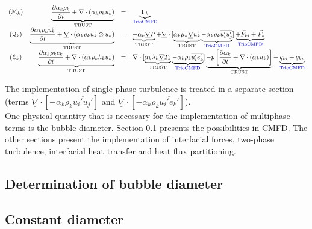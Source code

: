 \begin{equation} \label{eq_6}
	\begin{array}{c r c l}
		(\mathcal{M}_k) 
		& \underbrace{\frac{\partial  \alpha_k \rho_k}{\partial t} + \nabla \cdot ({\alpha_k \rho_k} \vec{u_k})}_\text{TRUST}
		& =
		& \underbrace{\Gamma_k}_\text{\blue TrioCMFD}
		\\
		(\mathcal{Q}_k) 
		& \underbrace{\frac{\partial \alpha_k \rho_k \vec{u_k}}{\partial t} + \underline{\nabla} \cdot ({\alpha_k \rho_k \vec{u_k}} \otimes \vec{u_k})}_\text{TRUST}
		& =
		& \underbrace{-\alpha_k \underline{\nabla} P}_\text{TRUST} +
		\underline{\nabla} \cdot [ \underbrace{\alpha_k \mu_k \underline{\underline{\nabla}} \vec{u_k}}_\text{TRUST} \underbrace{- \alpha_k\rho_k \overline{u_i'u_j'}}_\text{\blue TrioCMFD}]
		\underbrace{+ \vec{F}_{ki}
		+ \vec{F}_k}_\text{\blue TrioCMFD}
		\\
		(\mathcal{E}_k) 
		& \underbrace{\frac{\partial \alpha_k \rho_k e_k}{\partial t} + \nabla \cdot ({\alpha_k \rho_k h_k} \vec{u_k})}_\text{TRUST}
		& =
		& \nabla \cdot [ \underbrace{\alpha_k\lambda_k \underline{\nabla} T_k}_\text{TRUST}  \underbrace{- \alpha_k\rho_k \overline{u_i'e_k'}}_\text{\blue TrioCMFD} ] 
		\underbrace{-p \left[\frac{\partial \alpha_k}{\partial t} + \nabla \cdot (\alpha_k u_k)\right]}_\text{TRUST} +
		\underbrace{q_{ki} +
		q_{kp}}_\text{\blue TrioCMFD}
		
	\end{array}
\end{equation}

The implementation of single-phase turbulence is treated in a separate section (terms $\underline{\nabla} \cdot [ - \alpha_k\rho_k \overline{u_i'u_j'}]$ and  $\underline{\nabla} \cdot [ - \alpha_k\rho_k \overline{u_i'e_k'}]$). \\

One physical quantity that is necessary for the implementation of multiphase terms is the bubble diameter. Section \ref{seq_diameter} presents the possibilities in CMFD. The other sections present the implementation of interfacial forces, two-phase turbulence,  interfacial heat transfer and heat flux partitioning.

\subsection{Determination of bubble diameter}
\label{seq_diameter}

\subsection{Constant diameter}

